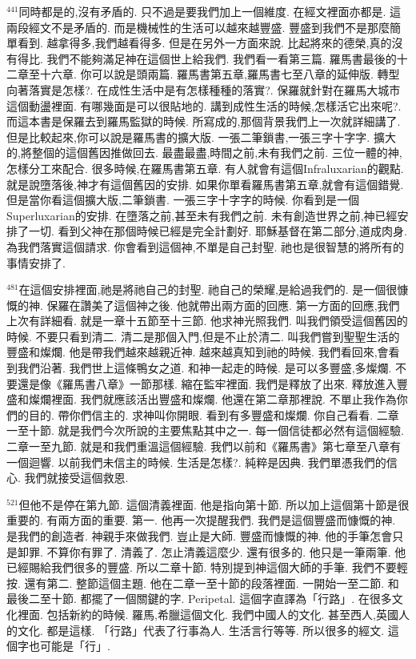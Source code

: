 \documentclass{book}
\begin{document}
$^{441}$同時都是的,沒有矛盾的.
只不過是要我們加上一個維度.
在經文裡面亦都是.
這兩段經文不是矛盾的.
而是機械性的生活可以越來越豐盛.
豐盛到我們不是那麼簡單看到.
越拿得多,我們越看得多.
但是在另外一方面來說.
比起將來的德榮,真的沒有得比.
我們不能夠滿足神在這個世上給我們.
我們看一看第三篇.
羅馬書最後的十二章至十六章.
你可以說是頭兩篇.
羅馬書第五章,羅馬書七至八章的延伸版.
轉型向著落實是怎樣?.
在成性生活中是有怎樣種種的落實?.
保羅就針對在羅馬大城市這個動盪裡面.
有哪幾面是可以很貼地的.
講到成性生活的時候,怎樣活它出來呢?.
而這本書是保羅去到羅馬監獄的時候.
所寫成的,那個背景我們上一次就詳細講了.
但是比較起來,你可以說是羅馬書的擴大版.
一張二筆鎖書,一張三字十字字.
擴大的,將整個的這個舊因推做回去.
最盡最盡,時間之前,未有我們之前.
三位一體的神,怎樣分工來配合.
很多時候,在羅馬書第五章.
有人就會有這個Infraluxarian的觀點.
就是說墮落後,神才有這個舊因的安排.
如果你單看羅馬書第五章,就會有這個錯覺.
但是當你看這個擴大版,二筆鎖書.
一張三字十字字的時候.
你看到是一個Superluxarian的安排.
在墮落之前,甚至未有我們之前.
未有創造世界之前,神已經安排了一切.
看到父神在那個時候已經是完全計劃好.
耶穌基督在第二部分,道成肉身.
為我們落實這個請求.
你會看到這個神,不單是自己封聖.
祂也是很智慧的將所有的事情安排了.

$^{481}$在這個安排裡面,祂是將祂自己的封聖.
祂自己的榮耀,是給過我們的.
是一個很慷慨的神.
保羅在讚美了這個神之後.
他就帶出兩方面的回應.
第一方面的回應,我們上次有詳細看.
就是一章十五節至十三節.
他求神光照我們.
叫我們領受這個舊因的時候.
不要只看到清二.
清二是那個入門,但是不止於清二.
叫我們嘗到聖聖生活的豐盛和燦爛.
他是帶我們越來越親近神.
越來越真知到祂的時候.
我們看回來,會看到我們沿著.
我們世上這條鴨女之道.
和神一起走的時候.
是可以多豐盛,多燦爛.
不要還是像《羅馬書八章》一節那樣.
縮在監牢裡面.
我們是釋放了出來.
釋放進入豐盛和燦爛裡面.
我們就應該活出豐盛和燦爛.
他還在第二章那裡說.
不單止我作為你們的目的.
帶你們信主的.
求神叫你開眼.
看到有多豐盛和燦爛.
你自己看看.
二章一至十節.
就是我們今次所說的主要焦點其中之一.
每一個信徒都必然有這個經驗.
二章一至九節.
就是和我們重溫這個經驗.
我們以前和《羅馬書》第七章至八章有一個迴響.
以前我們未信主的時候.
生活是怎樣?.
純粹是因典.
我們單憑我們的信心.
我們就接受這個救恩.

$^{521}$但他不是停在第九節.
這個清義裡面.
他是指向第十節.
所以加上這個第十節是很重要的.
有兩方面的重要.
第一.
他再一次提醒我們.
我們是這個豐盛而慷慨的神.
是我們的創造者.
神親手來做我們.
豈止是大師.
豐盛而慷慨的神.
他的手筆怎會只是卸罪.
不算你有罪了.
清義了.
怎止清義這麼少.
還有很多的.
他只是一筆兩筆.
他已經賜給我們很多的豐盛.
所以二章十節.
特別提到神這個大師的手筆.
我們不要輕按.
還有第二.
整節這個主題.
他在二章一至十節的段落裡面.
一開始一至二節.
和最後二至十節.
都擺了一個關鍵的字.
Peripetal.
這個字直譯為「行路」.
在很多文化裡面.
包括新約的時候.
羅馬,希臘這個文化.
我們中國人的文化.
甚至西人,英國人的文化.
都是這樣.
「行路」代表了行事為人.
生活言行等等.
所以很多的經文.
這個字也可能是「行」.
\end{document}
